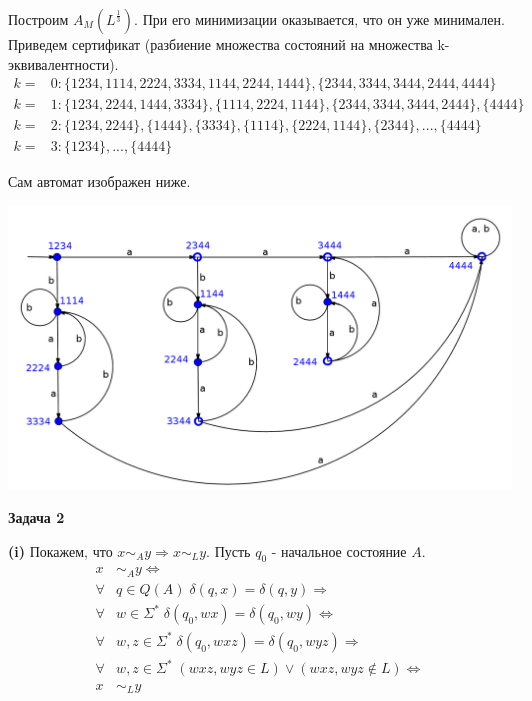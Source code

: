 \documentclass[10pt]{article}
\begin{document}
Построим $A_{M}(L^{\frac{1}{3}})$. При его минимизации оказывается, что он уже минимален. Приведем сертификат (разбиение множества состояний на множества k-эквивалентности).
\begin{align*}
  k =& 0: \{ 1234, 1114, 2224, 3334, 1144, 2244, 1444 \}, \{ 2344, 3344, 3444, 2444, 4444 \} \\
  k =& 1: \{ 1234, 2244, 1444, 3334 \}, \{ 1114, 2224, 1144 \}, \{ 2344, 3344, 3444, 2444 \}, \{ 4444 \} \\
  k =& 2: \{ 1234, 2244 \}, \{ 1444 \}, \{3334 \}, \{ 1114 \}, \{ 2224, 1144 \}, \{ 2344 \}, ..., \{ 4444 \} \\
  k =& 3: \{ 1234 \}, ... , \{ 4444 \}
\end{align*}

Сам автомат изображен ниже.

\centerline{\includegraphics[width=\textwidth]{2.png}}

\medskip

{\bf Задача 2}

{\bf (i)}
Покажем, что $x \sim_A y \Rightarrow x \sim_L y$. Пусть $q_0$ - начальное состояние $A$.
\begin{align*}
  x& \sim_A y \Leftrightarrow \\
  \forall& q \in Q(A) \; \delta(q, x) = \delta(q, y) \Rightarrow \\
  \forall& w \in \Sigma^* \; \delta(q_0, wx) = \delta(q_0, wy) \Leftrightarrow \\
  \forall& w, z \in \Sigma^* \; \delta(q_0, wxz) = \delta(q_0, wyz) \Rightarrow \\
  \forall& w, z \in \Sigma^* \; (wxz, wyz \in L) \vee (wxz, wyz \notin L) \Leftrightarrow \\
  x& \sim_L y
\end{align*}
\end{document}
